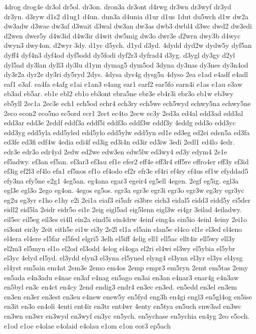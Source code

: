 {4drog
drog4e
dr3ol
dr5ol.
dr3on.
dron3a
dr3ont
d4rwg
dr3wn
dr3wyf
dr3yd
dr3yn.
d3ryw
d1s2
d1ug1
d4un.
dun3a
d4unia
d1ur
d1us
1dut
du5wch
d1w
dw2a
dw3adw
d3wae
dw3af
d3wait
d3wal
dw3an
dw3as
dwb3
dwbl4
d3wc
dwd2
dw3edi
d2wen
dwer5y
d4w3id
d4w3ir
d4wit
dw5mig
dw3o
dwr3e
d2wrn
dwy3b
d4wyc
dwyn3
dwy4on.
d2wyr
3dy.
d1yc
d5ych.
d1yd
d3yd.
4dydd
dyd2w
dydw5y
dyf5an
dyff4
dyf4n3
dyf4od
dyf5odd
dy5fodi
dyf2r3
dyfrad4
d3yg.
d3ygl
dy3gy
d2yl
dyl5ad
dy3lan
dyll3
dy3lu
d1ym
dymag5
dym5od
3dyna
dy3nas
dy3nes
dy3n4od
dy3r2a
dyr2e
dy3ri
dy5ryd
2dys.
4dysa
dys4g
dysg5a
4dyso
2ea
e1ad
e4adf
e4adl
eaf1
e3af.
ea4fa
e4afg
e1ai
e1an3
e4ang
ear1
earf2
ear5fo
earn4i
e1as
e1au
e3aw
eb3ad
eb5ar.
eb1e
ebl2
eb1o
eb3ont
ebra5ne
ebr3e
eb4r3i
ebr3o
eb1w
eb3wy
eb5yll
2ec1a
2ec3e
ech1
ech5od
echr4
ech3ry
ech5we
ech5wyd
echwy5na
echwy5ne
2eco
econ2
eco5no
ec5ord
ecr1
2ect
ec4to
2ecw
ec3y
2ed3a
ed4al
edd3ad
edd3al
edd3ar
edd3e
2eddf
eddf3a
eddf5i
eddf3o
eddf3w
eddf3y
4eddg
edd3o
edd3yc
edd3yg
edd5yla
edd5yled
edd5ylo
edd5ylw
edd5yn
ed1e
ed3eg
ed2ei
eden5a
ed3fa
ed3fe
ed3fi
edf4w
4edia
edi4f
ed3ig
ed3i4n
ed3ir
ed3iw
3edï
2edl1
ed4lo
4edr.
edr3e
edr3o
edr4yd
2edw
ed2we
edw3en
edw5lw
ed3wy4
ed3y
edym4
2e1e
ef5adwy.
ef3an
ef5an.
ef3ar3
ef3au
ef1e
efer2
eff4e
eff3r4
eff5re
effro4er
eff3y
ef3id
ef3ig
ef2l3
ef4lo
efn1
ef5nos
ef1o
ef4odo
ef2r
efr3e
ef4ri
ef4ry
ef4us
ef1w
efyddad5
efy3na
efy5ne
e2g1
4eg5an.
eg4ana
egar3
egeir4
eg5ell
4egen.
2egf
eg5ig.
egl3a
egl3e
egl3o
2ego
eg4on.
4egos
eg5os.
egr3a
egr3e
egr3i
egr3o
egr3w
eg3ry
egr3yc
eg2u
eg3yr
e1ho
e1hy
e2i
2ei1a
eiaf3
ei5afr
ei3bre
eich3
eidal5
eidd3
eidd5y
ei5der
eidl2
eid5la
2eidr
eidr5o
ei1e
2eig
eigl5ad
eig5lenn
eigl3w
ei4gr
3eilad
4eiladwy.
eil5ec
eil5eg
eil3es
ei4ll
ein2a
eind5i
ein4drw
4einf
eing4a
ein5io
4einl
4einy
2ei1o
ei3ont
eir3y
2eit
eith5e
ei1w
ei3y
2e2l
el1a
el5ain
elan5e
el4co
el1e
el3ed
el4eno
el4era
el4ere
el5far
el5fed
elgri5
3elh
el5iff
4elig
ell1
ell5ac
ellt4ir
ell5wy
ell3y
el2m3
el5myn
el1o
el2od
el3odd
4elog
el4oga
el2ri
el4wi
el3wy
el5ybia
el5ybr
el3yc
4elyd
el5yd.
el3ydd
elyn3
el3yna
el5yned
elyng4
el3ynn
el3yr
el3ys
el4ysg
el4yst
em5ain
em4at
2em3e
2emo
em4os
2emp
empr3
em5ryn
2emt
em5tas
2emy
en5ada
e4n3adu
e4nae
en3af
e4nag
en5ago
en3ai
en3an
e4nar3
enar4g
e4n3aw
en5byl
en3c
en4ct
en4cy
2end
endig3
endr4
en3ec
en3ed.
en5edd
en3el
en3em
en3en
en3er
en3est
en3eu
e4new
enew5y
en5fyd
eng3h
en4gi
engl3
en5gl4og
en5ise
en3it
en3o
en4oli
4enti
ent4ir
en3tr
ent4wr
4enty
en5tya
en5uch
enw3ad
en3wc
en3wn
en3wr
en3wyd
en3wyf
en3yc
en5ych.
en5ychase
en5ychia
en4yg
2eo
e5och.
e1od
e1oe
e4olae
e4olaid
e4olau
e1om
e1on
eor3
ep5ach
}
